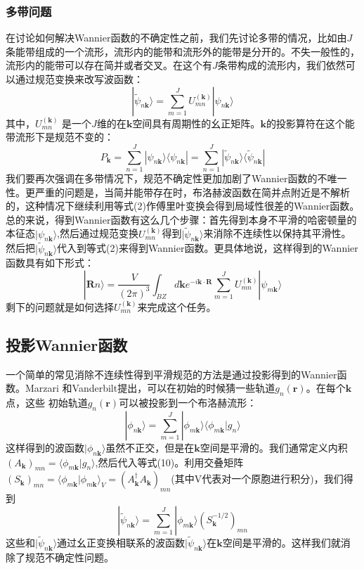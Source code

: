 \subsubsection{多带问题}
在讨论如何解决Wannier函数的不确定性之前，我们先讨论多带的情况，比如由$J$条能带组成的一个流形，流形内的能带和流形外的能带是分开的。不失一般性的，流形内的能带可以存在简并或者交叉。在这个有$J$条带构成的流形内，我们依然可以通过规范变换来改写波函数：
\begin{equation}
|\widetilde \psi_{n\bm{k}}\rangle= \sum_{m=1}^{J}U^{(\bm{k})}_{mn} |\psi_{n\bm{k}}\rangle
\end{equation}
其中，$U^{(\bm{k})}_{mn}$ 是一个$J$维的在$\bm{k}$空间具有周期性的幺正矩阵。$\bm{k}$的投影算符在这个能带流形下是规范不变的：
\begin{equation}
P_{\bm{k}}= \sum_{n=1}^{J}|\psi_{n\bm{k}}\rangle \langle\psi_{n\bm{k}} |= \sum_{n=1}^{J}|\widetilde\psi_{n\bm{k}}\rangle \langle\widetilde \psi_{n\bm{k}} |
\end{equation}
我们要再次强调在多带情况下，规范不确定性更加加剧了Wannier函数的不唯一性。更严重的问题是，当简并能带存在时，布洛赫波函数在简并点附近是不解析的，这种情况下继续利用等式(2)作傅里叶变换会得到局域性很差的Wannier函数。
总的来说，得到Wannier函数有这么几个步骤：首先得到本身不平滑的哈密顿量的本征态$|\psi_{n\bm{k}}\rangle$,然后通过规范变换$U^{(\bm{k})}_{mn}$得到$|\widetilde\psi_{n\bm{k}}\rangle$来消除不连续性以保持其平滑性。然后把$|\widetilde\psi_{n\bm{k}}\rangle$代入到等式(2)来得到Wannier函数。更具体地说，这样得到的Wannier函数具有如下形式：
\begin{equation}
|\bm{R}n \rangle=\frac{V}{(2\pi)^3} \int_{BZ}d\bm{k} e^{-i\bm{k}\cdot\bm{R}} \sum_{m=1}^{J}U^{(\bm{k})}_{mn}|\psi_{m\bm{k}}\rangle
\end{equation}
剩下的问题就是如何选择$U^{(\bm{k})}_{mn}$来完成这个任务。

\subsection{投影Wannier函数}
一个简单的常见消除不连续性得到平滑规范的方法是通过投影得到的Wannier函数。Marzari 和Vanderbilt提出，可以在初始的时候猜一些轨道$g_{n}(\bm{r})$。在每个$\bm{k}$点，这些 初始轨道$g_{n}(\bm{r})$可以被投影到一个布洛赫流形：
\begin{equation}
|\phi_{n\bm{k}}\rangle=\sum_{m=1}^{J}|\phi_{m\bm{k}}\rangle \langle \phi_{m\bm{k}}|g_{n}\rangle
\end{equation}
这样得到的波函数$|\phi_{n\bm{k}}\rangle$虽然不正交，但是在$\bm{k}$空间是平滑的。我们通常定义内积$(A_{\bm{k}})_{mn}=\langle \phi_{m\bm{k}}|g_{n}\rangle$,然后代入等式(10)。利用交叠矩阵$(S_{\bm{k}})_{mn}=\langle \phi_{m\bm{k}}| \phi_{m\bm{k}}\rangle_V=(A^\dagger_{\bm{k}}A_{\bm{k}})_{mn}$(其中V代表对一个原胞进行积分)，我们得到
\begin{equation}
|\widetilde\psi_{n\bm{k}}\rangle=\sum_{m=1}^{J}|\phi_{m\bm{k}}\rangle (S^{-1/2}_{\bm{k}})_{mn}
\end{equation}
这些和$|\widetilde\psi_{n\bm{k}}\rangle$通过幺正变换相联系的波函数$|\widetilde\psi_{n\bm{k}}\rangle$在$\bm{k}$空间是平滑的。这样我们就消除了规范不确定性问题。

